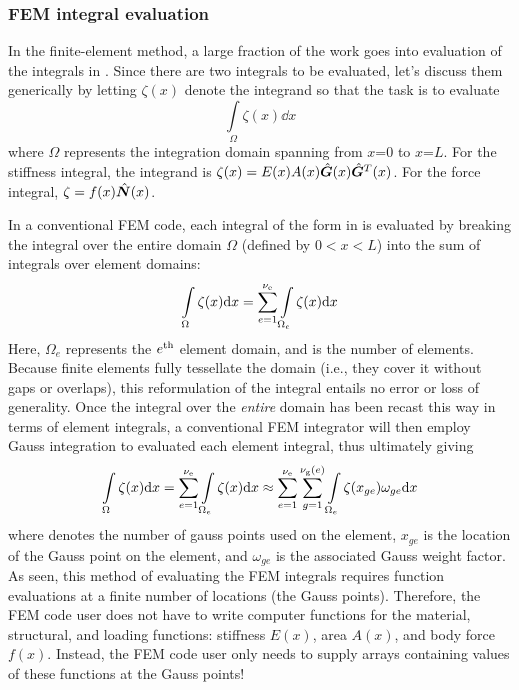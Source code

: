 \subsubsection{FEM integral evaluation}
In the finite-element method, a large fraction of the work goes into evaluation of the integrals in .  Since there are two integrals to be evaluated, let's discuss them generically by letting $\zeta(x)$ denote the integrand so that the task is to evaluate 
\begin{equation}
  \int\limits_\Omega \zeta(x) \dd x
\label{eq:LinearBarGenericIntegral}
\end{equation}
where $\Omega$ represents the integration domain spanning from $x$=$0$ to $x$=$L$. For the stiffness integral, the integrand is $\zeta(x)=E(x)A(x)\hat{\bm{G}}(x)\hat{\bm{G}}^T(x)$. For the force integral, $\zeta=f(x)\hat{\bm{N}}(x)$.

In a conventional FEM code, each integral of the form in  is evaluated by breaking the integral over the entire domain $\Omega$ (defined by $0<x<L$) into the sum of integrals over element domains:
\begin{equation}
  \int\limits_\Omega \zeta(x) \mathrm{d} x = \sum\limits_{e=1}^{{\nu_\text{e}}}\int\limits_{\Omega_e} \zeta(x) \mathrm{d} x
\label{eq:LinearBarGenericIntegralBrokenIntoElements}
\end{equation}
Here, $\Omega_e$ represents the $e^\text{th}$ element domain, and \numelements is the number of elements. Because finite elements fully tessellate the domain (i.e., they cover it without gaps or overlaps), this reformulation of the integral entails no error or loss of generality.  Once the integral over the \emph{entire} domain has been recast this way in terms of element integrals, a conventional FEM integrator will then employ Gauss integration to evaluated each element integral, thus ultimately giving
\begin{equation}
  \int\limits_\Omega \zeta(x) \mathrm{d} x = \sum\limits_{e=1}^{{\nu_\text{e}}}\int\limits_{\Omega_e} \zeta(x) \mathrm{d} x \approx \sum\limits_{e=1}^{{\nu_\text{e}}}\sum\limits_{g=1}^{{\nu_\text{g}(e)}}\int\limits_{\Omega_e} \zeta(x_{ge}) \omega_{ge} \mathrm{d} x
\label{eq:oneDFEMstyleIntegration}
\end{equation}
where \numgaussOnElemente denotes the number of gauss points used on the \eeth element, $x_{ge}$ is the location of the \gth Gauss point on the \eeth element, and $\omega_{ge}$ is the associated Gauss weight factor.  As seen, this method of evaluating the FEM integrals requires function evaluations at a finite number of locations (the Gauss points). Therefore, the FEM code user does not have to write computer functions for the material, structural, and loading functions: stiffness $E(x)$, area $A(x)$, and body force $f(x)$. Instead, the FEM code user only needs to supply arrays containing values of these functions at the Gauss points!

